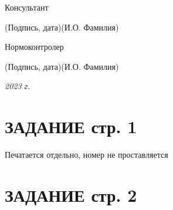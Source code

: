 \documentclass[14pt, russian]{scrartcl}
\begin{document}
\begin{titlepage}
\noindent Консультант \hfill \underline{\hspace{4cm}}\quad
\underline{\hspace{4cm}}

\vspace{-2ex}
\noindent\hspace{13.5ex}\normalsize\hspace{170pt}\hspace{2ex}\scriptsize{(Подпись, дата)}\normalsize\hspace{30pt}\hspace{6ex}\scriptsize{(И.О. Фамилия)}\normalsize

\bigskip

\noindent Нормоконтролер \hfill \underline{\hspace{4cm}}\quad
\underline{\hspace{4cm}}

\vspace{-2ex}
\noindent\hspace{13.5ex}\normalsize\hspace{170pt}\hspace{2ex}\scriptsize{(Подпись, дата)}\normalsize\hspace{30pt}\hspace{6ex}\scriptsize{(И.О. Фамилия)}\normalsize
\vfill

 


\begin{center}
\textsl{2023 г.}
\end{center}
\end{titlepage}


\setlength{\tabcolsep}{3pt}
\newpage
\setcounter{page}{2}

\section*{ЗАДАНИЕ стр. 1}

Печатается отдельно, номер не проставляется

\section*{ЗАДАНИЕ стр. 2}
\end{document}
